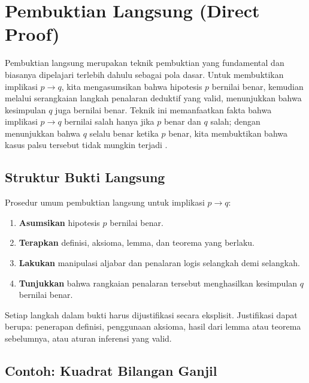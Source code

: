 \section{Pembuktian Langsung (Direct Proof)}

Pembuktian langsung merupakan teknik pembuktian yang fundamental dan biasanya dipelajari terlebih dahulu sebagai pola dasar. Untuk membuktikan implikasi $p \rightarrow q$, kita mengasumsikan bahwa hipotesis $p$ bernilai benar, kemudian melalui serangkaian langkah penalaran deduktif yang valid, menunjukkan bahwa kesimpulan $q$ juga bernilai benar. Teknik ini memanfaatkan fakta bahwa implikasi $p \rightarrow q$ bernilai salah hanya jika $p$ benar dan $q$ salah; dengan menunjukkan bahwa $q$ selalu benar ketika $p$ benar, kita membuktikan bahwa kasus palsu tersebut tidak mungkin terjadi \cite{rosen2019}.

\subsection{Struktur Bukti Langsung}

Prosedur umum pembuktian langsung untuk implikasi $p \rightarrow q$:

\begin{enumerate}
    \item \textbf{Asumsikan} hipotesis $p$ bernilai benar.
    \item \textbf{Terapkan} definisi, aksioma, lemma, dan teorema yang berlaku.
    \item \textbf{Lakukan} manipulasi aljabar dan penalaran logis selangkah demi selangkah.
    \item \textbf{Tunjukkan} bahwa rangkaian penalaran tersebut menghasilkan kesimpulan $q$ bernilai benar.
\end{enumerate}

Setiap langkah dalam bukti harus dijustifikasi secara eksplisit. Justifikasi dapat berupa: penerapan definisi, penggunaan aksioma, hasil dari lemma atau teorema sebelumnya, atau aturan inferensi yang valid.

\subsection{Contoh: Kuadrat Bilangan Ganjil}

